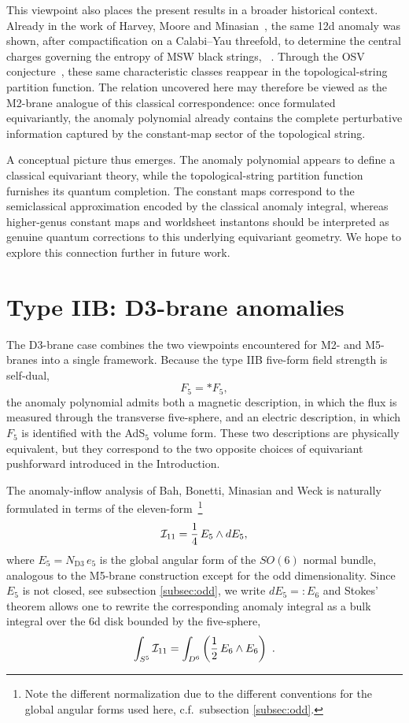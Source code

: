 \documentclass[11pt,a4paper]{article}
\def\cI{{\cal I}}
\theoremstyle{definition}
\theoremstyle{identity}
\theoremstyle{remark}
\newcommand{\be}{\begin{equation}}
\newcommand{\ee}{\end{equation}}
\begin{document}
This viewpoint also places the present results in a broader historical context. Already in the
work of Harvey, Moore and Minasian~\cite{Harvey:1998bx}, the same
12d anomaly was shown, after compactification on a
Calabi--Yau threefold, to determine the central charges governing the entropy of MSW black
strings, ~\cite{Maldacena:1997de}. Through the OSV conjecture~\cite{Ooguri:2004zv}, these same characteristic classes
reappear in the topological-string partition function. The relation uncovered here may therefore
be viewed as the M2-brane analogue of this classical correspondence: once formulated
equivariantly, the anomaly polynomial already contains the complete perturbative information
captured by the constant-map sector of the topological string.

A conceptual picture thus emerges. The anomaly polynomial appears to define a classical
equivariant theory, while the topological-string partition function furnishes its quantum
completion. The constant maps correspond to the semiclassical approximation encoded by the
classical anomaly integral, whereas higher-genus constant maps and worldsheet instantons should
be interpreted as genuine quantum corrections to this underlying equivariant geometry. We hope to explore this connection further in future
work.


\section{Type IIB: D3-brane anomalies}
\label{sec:IIB}

The D3-brane case combines the two viewpoints encountered for M2- and M5-branes into a single
framework. Because the type IIB five-form field strength is self-dual,
\be
F_5=*F_5,
\ee
the anomaly polynomial admits both a magnetic description, in which the flux is measured through
the transverse five-sphere, and an electric description, in which $F_5$ is identified with the
AdS$_5$ volume form. These two descriptions are physically equivalent, but they correspond to the
two opposite choices of equivariant pushforward introduced in the Introduction.

The anomaly-inflow analysis of Bah, Bonetti, Minasian and Weck
\cite{Bah:2020jas} is naturally formulated in terms of the eleven-form~\footnote{Note the different normalization due to the different conventions for the global angular forms used here, c.f.\ subsection \ref{subsec:odd}.}
\be
\cI_{11}=\frac14\, E_5\wedge dE_5,
\ee
where $E_5=N_\text{D3}\,e_5$ is the global angular form of the $SO(6)$ normal bundle, analogous to the M5-brane construction except for the odd dimensionality. Since $E_5$ is not closed, see subsection \ref{subsec:odd}, we write $dE_5=:E_6$ and Stokes' theorem allows one to rewrite the corresponding anomaly integral as a bulk
integral over the 6d disk bounded by the five-sphere,
\be
\int_{S^5}\cI_{11}
=
\int_{D^6} \left(\frac12\, E_6\wedge E_6\right)\ .
\ee
\end{document}
